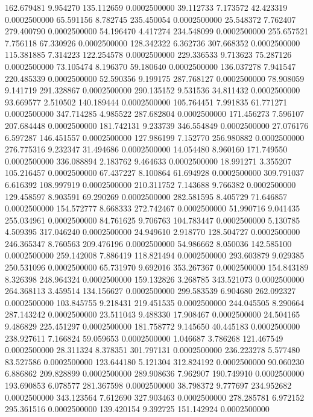 162.679481 9.954270 135.112659 0.0002500000
39.112733 7.173572 42.423319 0.0002500000
65.591156 8.782745 235.450054 0.0002500000
25.548372 7.762407 279.400790 0.0002500000
54.196470 4.417274 234.548099 0.0002500000
255.657521 7.756118 67.330926 0.0002500000
128.342322 6.362736 307.668352 0.0002500000
115.381885 7.314223 122.254578 0.0002500000
229.336533 9.713623 75.287126 0.0002500000
73.105474 8.196370 59.180640 0.0002500000
136.037278 7.941547 220.485339 0.0002500000
52.590356 9.199175 287.768127 0.0002500000
78.908059 9.141719 291.328867 0.0002500000
290.135152 9.531536 34.811432 0.0002500000
93.669577 2.510502 140.189444 0.0002500000
105.764451 7.991835 61.771271 0.0002500000
347.714285 4.985522 287.682804 0.0002500000
171.456273 7.596107 207.684448 0.0002500000
181.742131 9.233739 346.554849 0.0002500000
27.076176 6.597287 146.451557 0.0002500000
127.986199 7.152770 256.980882 0.0002500000
276.775316 9.232347 31.494686 0.0002500000
14.054480 8.960160 171.749550 0.0002500000
336.088894 2.183762 9.464633 0.0002500000
18.991271 3.355207 105.216457 0.0002500000
67.437227 8.100864 61.694928 0.0002500000
309.791037 6.616392 108.997919 0.0002500000
210.311752 7.143688 9.766382 0.0002500000
129.458597 8.903591 69.290269 0.0002500000
282.581595 8.405729 71.646857 0.0002500000
154.572777 8.668333 272.742467 0.0002500000
51.990716 9.041435 255.034961 0.0002500000
84.761625 9.706763 104.783447 0.0002500000
5.130785 4.509395 317.046240 0.0002500000
24.949610 2.918770 128.504727 0.0002500000
246.365347 8.760563 209.476196 0.0002500000
54.986662 8.050036 142.585100 0.0002500000
259.142008 7.886419 118.821494 0.0002500000
293.603879 9.029385 250.531096 0.0002500000
65.731970 9.692016 353.267367 0.0002500000
154.843189 8.326398 248.964324 0.0002500000
159.132826 3.268785 343.521073 0.0002500000
264.368113 3.459514 134.156627 0.0002500000
299.583539 6.904680 262.092327 0.0002500000
103.845755 9.218431 219.451535 0.0002500000
244.045505 8.290664 287.143242 0.0002500000
23.511043 9.488330 17.908467 0.0002500000
24.504165 9.486829 225.451297 0.0002500000
181.758772 9.145650 40.445183 0.0002500000
238.927611 7.166824 59.059653 0.0002500000
1.046687 3.786268 121.467549 0.0002500000
28.311324 8.378351 301.797131 0.0002500000
236.223278 5.577480 83.527586 0.0002500000
123.644180 5.121304 312.824192 0.0002500000
90.060230 6.886862 209.828899 0.0002500000
289.908636 7.962907 190.749910 0.0002500000
193.690853 6.078577 281.367598 0.0002500000
38.798372 9.777697 234.952682 0.0002500000
343.123564 7.612690 327.903463 0.0002500000
278.285781 6.972152 295.361516 0.0002500000
139.420154 9.392725 151.142924 0.0002500000
